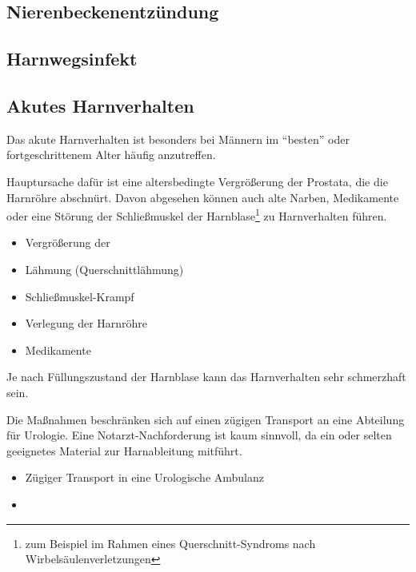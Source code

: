 \subsection{Nierenbeckenentzündung}
\label{topic:nierenbeckenentzuendung}

\subsection{Harnwegsinfekt}
\label{topic:harnwegsinfekt}

\subsection{Akutes Harnverhalten}




Das akute Harnverhalten ist besonders bei Männern im "`besten"'
oder fortgeschrittenem Alter häufig anzutreffen. 

{
Hauptursache  dafür ist eine
altersbedingte Vergrößerung der Prostata, die die Harnröhre abschnürt. Davon abgesehen
können auch alte Narben, Medikamente oder eine Störung der
Schließmuskel der Harnblase\footnote{zum Beispiel im Rahmen eines
Querschnitt-Syndroms nach Wirbelsäulenverletzungen} zu
Harnverhalten führen. 
}
{
\begin{itemize}
     \item Vergrößerung der 
    \item Lähmung (Querschnittlähmung)
    \item Schließmuskel-Krampf
    \item Verlegung der Harnröhre
    \item Medikamente
\end{itemize}
}{}{}{}

Je nach Füllungszustand der Harnblase kann das
Harnverhalten sehr schmerzhaft sein.

Die Maßnahmen beschränken sich auf einen zügigen Transport
an eine Abteilung für Urologie. Eine Notarzt-Nachforderung
ist kaum sinnvoll, da ein  oder  selten geeignetes
Material zur Harnableitung mitführt. 

{
\begin{itemize}
    \item Zügiger Transport in eine Urologische Ambulanz
    \item {}
\end{itemize}
}




